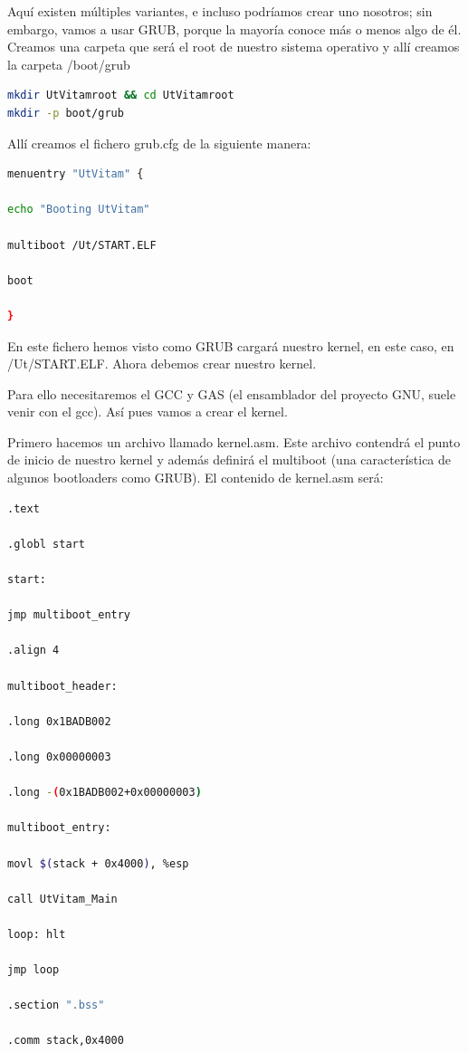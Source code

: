 \documentclass[12pt, twoside]{report}
\begin{document}
Aquí existen múltiples variantes, e incluso podríamos crear uno nosotros; sin embargo, vamos a usar GRUB, porque la mayoría conoce más o menos algo de él. Creamos una carpeta que será el root de nuestro sistema operativo y allí creamos la carpeta /boot/grub

\begin{lstlisting}[language=bash]
mkdir UtVitamroot && cd UtVitamroot
mkdir -p boot/grub
\end{lstlisting}

Allí creamos el fichero grub.cfg de la siguiente manera:

\begin{lstlisting}[language=bash]
menuentry "UtVitam" {

echo "Booting UtVitam"

multiboot /Ut/START.ELF

boot

}
\end{lstlisting}


En este fichero hemos visto como GRUB cargará nuestro kernel, en este caso, en /Ut/START.ELF. Ahora debemos crear nuestro kernel.

Para ello necesitaremos el GCC y GAS (el ensamblador del proyecto GNU, suele venir con el gcc). Así pues vamos a crear el kernel.

Primero hacemos un archivo llamado kernel.asm. Este archivo contendrá el punto de inicio de nuestro kernel y además definirá el multiboot (una característica de algunos bootloaders como GRUB). El contenido de kernel.asm será:

\begin{lstlisting}[language=bash]
.text

.globl start

start:

jmp multiboot_entry

.align 4

multiboot_header:

.long 0x1BADB002

.long 0x00000003

.long -(0x1BADB002+0x00000003)

multiboot_entry:

movl $(stack + 0x4000), %esp

call UtVitam_Main

loop: hlt

jmp loop

.section ".bss"

.comm stack,0x4000

\end{lstlisting}
\end{document}
